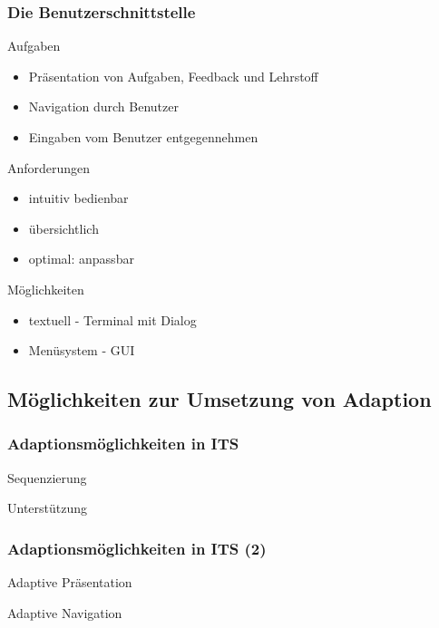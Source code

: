 \documentclass{beamer}
\begin{document}
\begin{frame}
  \frametitle{Die Benutzerschnittstelle}

  \begin{block}{Aufgaben}
    \begin{itemize}
      \item Präsentation von Aufgaben, Feedback und Lehrstoff
      \item Navigation durch Benutzer
      \item Eingaben vom Benutzer entgegennehmen
    \end{itemize}
  \end{block}

  \begin{block}{Anforderungen}
    \begin{itemize}
      \item intuitiv bedienbar
      \item übersichtlich
      \item optimal: anpassbar
    \end{itemize}
  \end{block}

  \begin{block}{Möglichkeiten}
    \begin{itemize}
      \item textuell - Terminal mit Dialog
      \item Menüsystem - GUI
    \end{itemize}
  \end{block}
\end{frame}

\subsection{Möglichkeiten zur Umsetzung von Adaption}
\begin{frame}
  \frametitle{Adaptionsmöglichkeiten in ITS}

  \begin{block}{Sequenzierung}

  \end{block}

  \begin{block}{Unterstützung}

  \end{block}

\end{frame}

\begin{frame}
  \frametitle{Adaptionsmöglichkeiten in ITS (2)}

  \begin{block}{Adaptive Präsentation}

  \end{block}

  \begin{block}{Adaptive Navigation}

  \end{block}
\end{frame}
\end{document}

